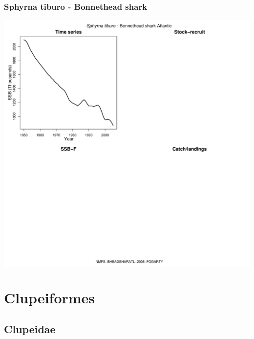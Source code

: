 \subsubsection{Sphyrna tiburo - Bonnethead shark}
\begin{center}
\includegraphics[width=1.2\textwidth]{../R/figures/NMFS-BHEADSHARATL-2006-FOGARTY.pdf}
\end{center}

\section{Clupeiformes}

\subsection{Clupeidae}


